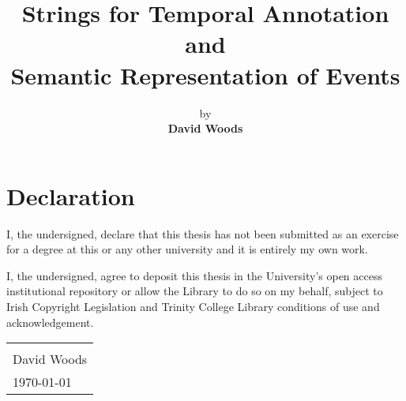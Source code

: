 \documentclass[a4paper,12pt,leqno]{article}
\title{\textbf{Strings for Temporal Annotation and\\Semantic Representation of Events}}
\author{by\\{\textbf{David Woods}}\bigskip\bigskip}
\date{\parbox{\linewidth}{\centering%
		{\large A dissertation submitted\\in fulfillment of the requirements\\for the Degree of\\\textbf{Doctor of Philosophy}}\\		
		\bigskip\bigskip\bigskip
		{\Large \textbf{University of Dublin, Trinity College}}\\\endgraf \monthyeardate\today}{\small \vspace{\fill} Supervised by: Dr Tim Fernando, Dr Carl Vogel}}
\begin{document}
\maketitle
\thispagestyle{empty}

\newpage
{}
\section*{Declaration}
\noindent
I, the undersigned, declare that this thesis has not been submitted as an exercise for a degree at this or any other university and it is entirely my own work.\par

\vspace{2em}

\noindent
I, the undersigned, agree to deposit this thesis in the University's open access institutional repository or allow the Library to do so on my behalf, subject to Irish Copyright Legislation and Trinity College Library conditions of use and acknowledgement.


\vspace{\fill}

\begin{table*}[!htbp]
	\flushright
	\begin{tabular}{l}
		\makebox[10cm]{\hrulefill}\\[0.5cm]
		David Woods\\[0.25cm]
		{\monthyeardate\today}
	\end{tabular}
\end{table*}

\vspace{5em}

\newpage
\begin{abstract}
\noindent
\end{abstract}
\end{document}
